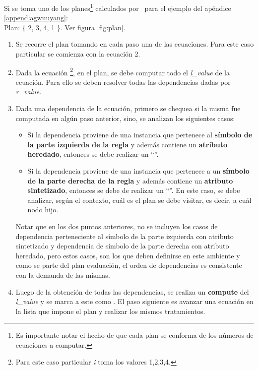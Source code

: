 Si se toma uno de los planes\footnote{Es importante notar el hecho de que cada plan se conforma de los números de ecuaciones a computar.} calculados por \maggen\ para el ejemplo del apéndice \ref{append:agwuuyang}:\\

\underline{Plan:} \{ 2, 3, 4, 1 \}. Ver figura \ref{fig:plan}.

\begin{enumerate}
\item Se recorre el plan tomando en cada paso una de las ecuaciones. Para este caso particular se comienza con la ecuación 2.

\item Dada la ecuación \footnote{Para este caso particular \textit{i} toma los valores 1,2,3,4.}, en el plan, se debe computar todo el \textit{l\_value} de la ecuación. Para ello se deben resolver todas las dependencias dadas por \textit{r\_value}.

\item Dada una dependencia de la ecuación, primero se chequea si la misma fue computada en algún paso anterior, sino, se analizan los siguientes casos:

\begin{itemize}
\item Si la dependencia proviene de una instancia que pertenece al \textbf{símbolo de la parte izquierda de la regla} y además contiene un \textbf{atributo heredado}, entonces se debe realizar un ``''.

\item Si la dependencia proviene de una instancia que pertenece a un \textbf{símbolo de la parte derecha de la regla} y además contiene un \textbf{atributo sintetizado}, entonces se debe de realizar un ``''. En este caso, se debe analizar, según el contexto, cuál es el plan se debe visitar, es decir, a cuál nodo hijo. 
\end{itemize}

Notar que en los dos puntos anteriores, no se incluyen los casos de dependencia perteneciente al símbolo de la parte izquierda con atributo sintetizado y dependencia de símbolo de la parte derecha con atributo heredado, pero estos casos, son los que deben definirse en este ambiente y como se parte del plan evaluación, el orden de dependencias es consistente con la demanda de las mismas.

\item Luego de la obtención de todas las dependencias, se realiza un \textbf{compute} del \textit{l\_value} y se marca a este como . El paso siguiente es avanzar una ecuación en la lista que impone el plan y realizar los mismos tratamientos.
\end{enumerate} 

